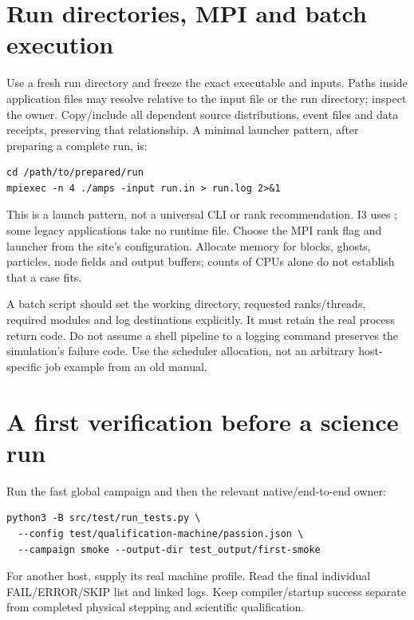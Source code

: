 \section{Run directories, MPI and batch execution}
Use a fresh run directory and freeze the exact executable and inputs. Paths
inside application files may resolve relative to the input file or the run
directory; inspect the owner. Copy/include all dependent source distributions,
event files and data receipts, preserving that relationship.
A minimal launcher pattern, after preparing a complete run, is:
\begin{lstlisting}
cd /path/to/prepared/run
mpiexec -n 4 ./amps -input run.in > run.log 2>&1
\end{lstlisting}
This is a launch pattern, not a universal CLI or rank recommendation. I3 uses
; some legacy applications take no runtime file.
Choose the MPI rank flag and launcher from the site's configuration. Allocate
memory for blocks, ghosts, particles, node fields and output buffers; counts
of CPUs alone do not establish that a case fits.

A batch script should set the working directory, requested ranks/threads,
required modules and log destinations explicitly. It must retain the real
process return code. Do not assume a shell pipeline to a logging command
preserves the simulation's failure code. Use the scheduler allocation, not
an arbitrary host-specific job example from an old manual.

\section{A first verification before a science run}
Run the fast global campaign and then the relevant native/end-to-end owner:
\begin{lstlisting}
python3 -B src/test/run_tests.py \
  --config test/qualification-machine/passion.json \
  --campaign smoke --output-dir test_output/first-smoke
\end{lstlisting}
For another host, supply its real machine profile. Read the final individual
FAIL/ERROR/SKIP list and linked logs. Keep compiler/startup success separate
from completed physical stepping and scientific qualification.
